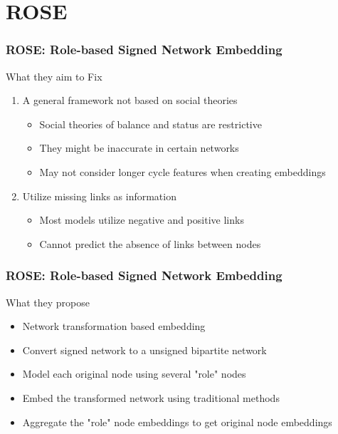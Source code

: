 \documentclass{beamer}
\begin{document}
\section{ROSE}

\begin{frame}
    \frametitle{ROSE: Role-based Signed Network Embedding
    }

    What they aim to Fix
    \begin{enumerate}
        \item A general framework not based on social theories
        \begin{itemize}
            \item Social theories of balance and status are restrictive 
            \item They might be inaccurate in certain networks
            \item May not consider longer cycle features when creating embeddings
        \end{itemize}
        \item Utilize missing links as information
        \begin{itemize}
            \item Most models utilize negative and positive links 
            \item Cannot predict the absence of links between nodes 
        \end{itemize}
    \end{enumerate}
\end{frame}

\begin{frame}
    \frametitle{ROSE: Role-based Signed Network Embedding}
    What they propose 
    \begin{itemize}
        \item Network transformation based embedding
        \item Convert signed network to a unsigned bipartite network
        \item Model each original node using several "role" nodes
        \item Embed the transformed network using traditional methods
        \item Aggregate the "role" node embeddings to get original node embeddings
    \end{itemize}
\end{frame}
\end{document}
